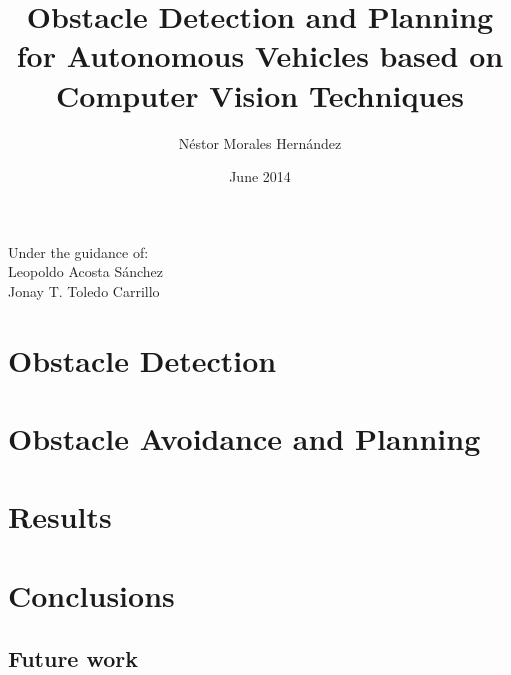 \documentclass{beamer}
\title{Obstacle Detection and Planning for Autonomous Vehicles based on Computer Vision Techniques}
\author{Néstor Morales Hernández}
\institute{Departamento de Ingeniería Informática \\ Universidad de La Laguna}
\date{June 2014}
\makeatletter
\let\Oldincludegraphics\includegraphics
\renewcommand\includegraphics[2][\@empty]{%
\immediate\message{== #1 ==}
\immediate\typeout{== #2 ==}
\immediate\write18{mkdir -p downsampled; IFP=#2 ; %
echo "Processing $IFP" ; %
IFN=$(basename $IFP) ; %
echo "downsampled/$IFN" > tmpname ; %
if [ ! -f downsampled/$IFN ]; then %
echo "File downsampled/$IFN not found! Converting..." ; %
convert $IFP -resize 100x downsampled/$IFN ; %
else %
echo "Found downsampled/$IFN - reusing." ; %
fi ; %
} %
\immediate\openin\myinput=tmpname
\bgroup
  \endlinechar=-1
  \immediate\read\myinput to \localline
  \global\let\myTmpFileName\localline
\egroup
\immediate\closein\myinput
\immediate\typeout{== \myTmpFileName .. #1 ==}
\Oldincludegraphics[#1]{\myTmpFileName}
} %
\makeatother
\begin{document}

  \begin{frame}[plain]
    \centering
    

    \titlepage
    
    \tiny
    \hfill Under the guidance of:\\
    \scriptsize
    \hfill Leopoldo Acosta Sánchez\\
    \hfill Jonay T. Toledo Carrillo

  \end{frame}


\section{Obstacle Detection}






\section{Obstacle Avoidance and Planning}


  
\section{Results}
% 

\section{Conclusions}

  \subsection{Future work}
\end{document}

